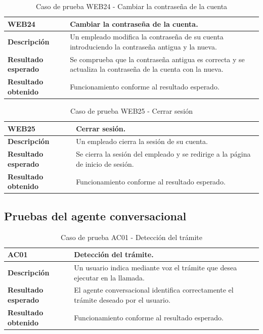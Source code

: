     \begin{table}[H]
        \centering
        \begin{tabular}{|l|p{12cm}|}
        \hline
        \textbf{WEB24} & Cambiar la contraseña de la cuenta. \\ \hline
        \textbf{Descripción} & Un empleado modifica la contraseña de su cuenta introduciendo la contraseña antigua y la nueva. \\ \hline
        \textbf{Resultado esperado} & Se comprueba que la contraseña antigua es correcta y se actualiza la contraseña de la cuenta con la nueva.  \\ \hline
        \textbf{Resultado obtenido} & Funcionamiento conforme al resultado esperado. \\ \hline
        \end{tabular}
        \caption{Caso de prueba WEB24 - Cambiar la contraseña de la cuenta}
    \end{table}

    \begin{table}[H]
        \centering
        \begin{tabular}{|l|p{12cm}|}
        \hline
        \textbf{WEB25} & Cerrar sesión. \\ \hline
        \textbf{Descripción} & Un empleado cierra la sesión de su cuenta. \\ \hline
        \textbf{Resultado esperado} & Se cierra la sesión del empleado y se redirige a la página de inicio de sesión. \\ \hline
        \textbf{Resultado obtenido} & Funcionamiento conforme al resultado esperado. \\ \hline
        \end{tabular}
        \caption{Caso de prueba WEB25 - Cerrar sesión}
    \end{table}


\subsection{Pruebas del agente conversacional}

    \begin{table}[H]
        \centering
        \begin{tabular}{|l|p{12cm}|}
        \hline
        \textbf{AC01} & Detección del trámite. \\ \hline
        \textbf{Descripción} & Un usuario indica mediante voz el trámite que desea ejecutar en la llamada.  \\ \hline
        \textbf{Resultado esperado} & El agente conversacional identifica correctamente el trámite deseado por el usuario. \\ \hline
        \textbf{Resultado obtenido} & Funcionamiento conforme al resultado esperado. \\ \hline
        \end{tabular}
        \caption{Caso de prueba AC01 - Detección del trámite}
    \end{table}

